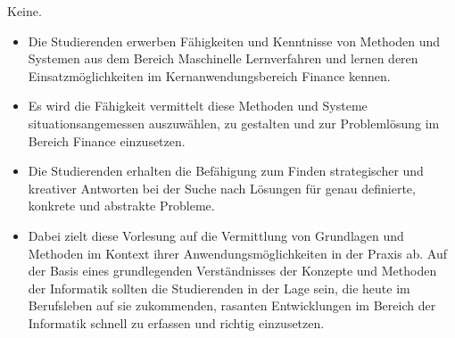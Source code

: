 \begin{course}
\begin{styleenv}
\begin{conditions}Keine.\end{conditions}


\end{styleenv}

\begin{learningoutcomes}
\begin{itemize}\item Die Studierenden erwerben Fähigkeiten und Kenntnisse von Methoden und Systemen aus dem Bereich Maschinelle Lernverfahren und lernen deren Einsatzmöglichkeiten im Kernanwendungsbereich Finance kennen.  \item Es wird die Fähigkeit vermittelt diese Methoden und Systeme situationsangemessen auszuwählen, zu gestalten und zur Problemlösung im Bereich Finance einzusetzen.  \item Die Studierenden erhalten die Befähigung zum Finden strategischer und kreativer Antworten bei der Suche nach Lösungen für genau definierte, konkrete und abstrakte Probleme.  \item Dabei zielt diese Vorlesung auf die Vermittlung von Grundlagen und Methoden im Kontext ihrer Anwendungsmöglichkeiten in der Praxis ab. Auf der Basis eines grundlegenden Verständnisses der Konzepte und Methoden der Informatik sollten die Studierenden in der Lage sein, die heute im Berufsleben auf sie zukommenden, rasanten Entwicklungen im Bereich der Informatik schnell zu erfassen und richtig einzusetzen.  \end{itemize}
\end{learningoutcomes}


\end{course}
